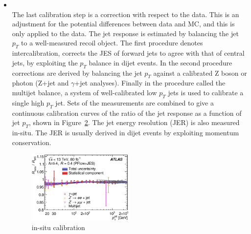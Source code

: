 \begin{itemize}
\begin{figure}[tbp]
\begin{center}
{      \cite{JETM-2018-05}
    }
    \label{fig:GSC}
    \end{center}
    \end{figure}
    \item \textbf{} \\
    The last calibration step is a correction with respect to the data. 
    This is an adjustment for the potential differences between data and MC, and this is only applied to the data.
    The jet response is estimated by balancing the jet $p_T$ to a well-measured recoil object. 
    The first procedure denotes intercalibration, corrects the JES of forward jets to agree with that of central jets, by exploiting the $p_T$ balance in dijet events. 
    In the second procedure corrections are derived by balancing the jet $p_T$ against a calibrated Z boson or photon (Z+jet and $\gamma$+jet analyses). 
    Finally in the procedure called the multijet balance, a system of well-calibrated low $p_T$ jets is used to calibrate a single high $p_T$ jet. %
    Sets of the measurements are combined to give a continuous calibration curves of the ratio of the jet response as a function of jet $p_T$, shown in Figure~\ref{fig:in-situcalibration}.
    The jet energy resolution (JER) is also measured in-situ. 
    The JER is usually derived in dijet events by exploiting momentum conservation.
    \begin{figure}[tbp]
    \begin{center}
    \includegraphics[width=0.5\textwidth,keepaspectratio]{figures/Reconstruction/insitucalibration}
    \caption{
    in-situ calibration \cite{JETM-2018-05}
    }
    \label{fig:in-situcalibration}
    \end{center}
    \end{figure}
\end{itemize}
